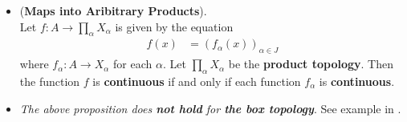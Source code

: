 \documentclass[11pt]{article}
\begin{document}
\begin{itemize}
\item \begin{proposition} (\textbf{Maps into Aribitrary Products}). \citep{munkres2000topology}\\
Let $f : A \rightarrow \prod_{\alpha}X_{\alpha}$ is given by the equation
\begin{align*}
f(x) &= (f_{\alpha}(x))_{\alpha \in J}
\end{align*}
where $f_{\alpha} : A \rightarrow X_\alpha$ for each $\alpha$. Let  $\prod_{\alpha}X_{\alpha}$ be the \textbf{product topology}. Then the
function $f$ is \textbf{continuous} if and only if each function $f_{\alpha}$  is \textbf{continuous}.
\end{proposition}

\item \begin{remark}
\emph{The above proposition does \textbf{not hold} for \textbf{the box topology}}. See example in \citep{munkres2000topology}.
\end{remark}
\end{itemize}
\end{document}
